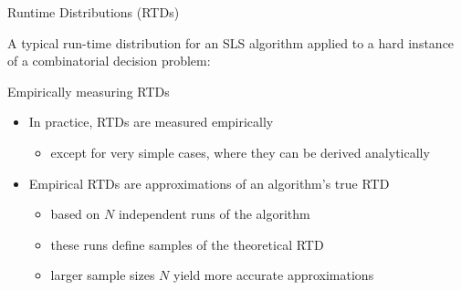 \begin{frame}[c]{Runtime Distributions (RTDs)}

A typical run-time distribution for an SLS algorithm applied to a hard instance of a combinatorial decision problem:


\end{frame}


\begin{frame}[c]{Empirically measuring RTDs}


\begin{itemize}

\item In practice, RTDs are measured empirically 
\begin{itemize}
  \item except for very simple cases, where they can be derived analytically
 \end{itemize}
        
\pause
\medskip

\item Empirical RTDs are \alert{approximations} of an algorithm's true RTD
	\begin{itemize}
	  \item based on $N$ independent runs of the algorithm %
	  \item these runs define \alert{samples of the theoretical RTD}
	  \item larger \alert{sample sizes} $N$ yield more accurate approximations 
	\end{itemize}

\end{itemize}



\end{frame}

